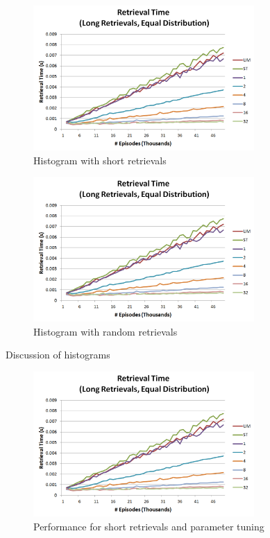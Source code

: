 \documentclass[11pt]{article} %
\begin{document}
\begin{figure}[h]
\caption{Histogram with short retrievals}
\centering
\includegraphics[width=0.75\textwidth]{images/ret_worst_eq}
\end{figure}

\begin{figure}[h]
\caption{Histogram with random retrievals}
\centering
\includegraphics[width=0.75\textwidth]{images/ret_worst_eq}
\end{figure}

Discussion of histograms

\begin{figure}[h]
\caption{Performance for short retrievals and parameter tuning}
\centering
\includegraphics[width=0.75\textwidth]{images/ret_worst_eq}
\end{figure}
\end{document}
